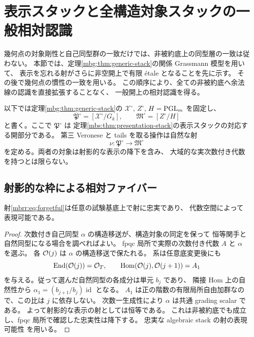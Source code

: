 \section{表示スタックと全構造対象スタックの一般相対認識}
\label{mbrr:sec:relative-recognition}

幾何点の対象剛性と自己同型群の一致だけでは、非被約底上の同型層の一致は従わない。
本節では、定理\ref{mbg:thm:generic-stack}の関係 Grassmann 模型を用いて、
表示を忘れる射がさらに非空開上で有限 \'etale となることを先に示す。
その後で幾何点の慣性の一致を用いる。
この順序により、全ての非被約底へ余法線の認識を直接拡張することなく、
一般開上の相対認識を得る。

以下では定理\ref{mbg:thm:generic-stack}の
$\mathcal X^\circ$, $Z^\circ$, $H=\operatorname{PGL}_m$ を固定し、
\[
 \mathfrak P^\circ=[\mathcal X^\circ/G_k],
 \qquad
 \mathfrak M^\circ=[Z^\circ/H]
\]
と書く。ここで $\mathfrak P^\circ$ は
定理\ref{mbs:thm:presentation-stack}の表示スタックの対応する開部分である。
第三 Veronese と tails を取る操作は自然な射
\begin{equation}\label{mbrr:eq:forgetful}
 \nu:\mathfrak P^\circ\longrightarrow\mathfrak M^\circ
\end{equation}
を定める。両者の対象は射影的な表示の降下を含み、
大域的な実次数付き代数を持つとは限らない。

\subsection{射影的な枠による相対ファイバー}

\begin{lemma}[表示を忘れる射の忠実性]
\label{mbrr:lem:faithful}
射\eqref{mbrr:eq:forgetful}は任意の試験基底上で射に忠実であり、
代数空間によって表現可能である。
\end{lemma}
\begin{proof}
次数付き自己同型 $\alpha$ の構造移送が、構造対象の同定を保って
恒等関手と自然同型になる場合を調べればよい。
fpqc 局所で実際の次数付き代数 $A$ と $\alpha$ を選ぶ。
各 $\mathcal O(j)$ は $\alpha$ の構造移送で保たれる。
系は任意底変更後にも
\[
 \operatorname{End}(\mathcal O(j))=\mathcal O_T,\qquad
 \operatorname{Hom}(\mathcal O(j),\mathcal O(j+1))=A_1
\]
を与える。従って選んだ自然同型の各成分は単元 $b_j$ であり、
隣接 Hom 上の自然性から
$\alpha_1=(b_{j+1}/b_j)\operatorname{id}$ となる。
$A_1$ は正の階数の有限局所自由加群なので、この比は $j$ に依存しない。
次数一生成性により $\alpha$ は共通 grading scalar である。
よって射影的な表示の射としては恒等である。
これは非被約底でも成立し、fpqc 局所で確認した忠実性は降下する。
忠実な algebraic stack の射の表現可能性
\cite[Tag~04Y5]{MBGStacks}を用いる。
\end{proof}

